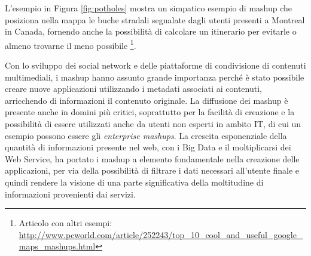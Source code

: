 L'esempio in Figura \ref{fig:potholes} mostra un simpatico esempio di mashup che posiziona nella mappa le buche stradali segnalate dagli utenti presenti a Montreal in Canada, fornendo anche la possibilità di calcolare un itinerario per evitarle o almeno trovarne il meno possibile \footnote{Articolo con altri esempi: \url{http://www.pcworld.com/article/252243/top_10_cool_and_useful_google_maps_mashups.html}}. 

Con lo sviluppo dei social network e delle piattaforme di condivisione di contenuti multimediali, i mashup hanno assunto grande importanza perché è stato possibile creare nuove applicazioni utilizzando i metadati associati ai contenuti, arricchendo di informazioni il contenuto originale.
La diffusione dei mashup è presente anche in domini più critici, soprattutto per la facilità di creazione e la possibilità di essere utilizzati anche da utenti non esperti in ambito IT, di cui un esempio possono essere gli \emph{enterprise mashups}.
La crescita esponenziale della quantità di informazioni presente nel web, con i Big Data e il moltiplicarsi dei Web Service, ha portato i mashup a elemento fondamentale nella creazione delle applicazioni, per via della possibilità di filtrare i dati necessari all'utente finale e quindi rendere la visione di una parte significativa della moltitudine di informazioni provenienti dai servizi.


